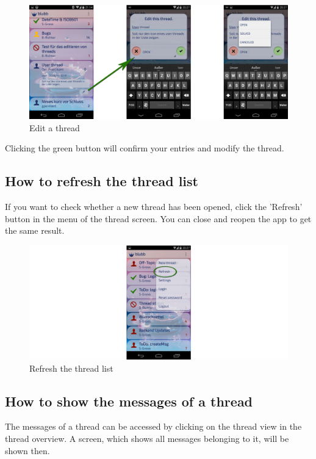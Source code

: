 \documentclass[12pt,a4paper,oneside]{report}
\begin{document}
\begin{figure}[!ht]
    \includegraphics[width=\linewidth]{EditThread.png}
    \caption{Edit a thread}
\end{figure}

Clicking the green button will confirm your entries and modify the thread. 

\subsection{How to refresh the thread list}
If you want to check whether a new thread has been opened, click the 'Refresh' button in the menu of the thread screen. You can close and reopen the app to get the same result.

\begin{figure}[!ht]
    \includegraphics[width=\linewidth]{RefreshThread.png}
    \caption{Refresh the thread list}
\end{figure}

\subsection{How to show the messages of a thread}
The messages of a thread can be accessed by clicking on the thread view in the thread overview. A screen, which shows all messages belonging to it, will be shown then.
\end{document}

